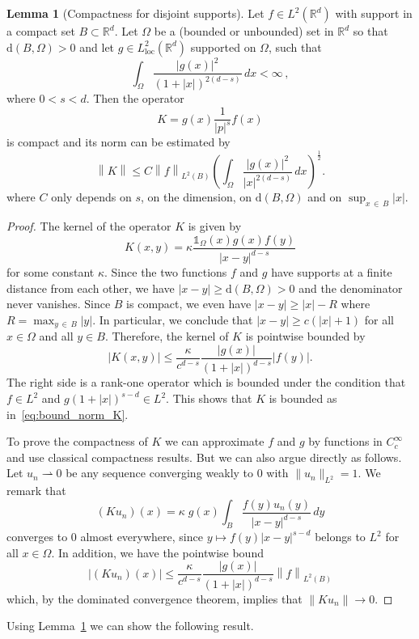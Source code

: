 \documentclass[10pt]{amsart}
\theoremstyle{definition}
\newtheorem{lemma}[cdrthm]{Lemma}
\newcommand{\R}{\mathbb{R}}
\newcommand{\rmd}{\mathrm{d}}
\DeclareMathOperator{\loc}{loc}
\newcommand\1{{\ensuremath {\mathds 1} }}
\newcommand{\wto}{\rightharpoonup}
\newcommand{\ii}{\infty}
\newcommand{\norm}[1]{ \left\| #1 \right\|}
\renewcommand{\geq}{\geqslant}
\renewcommand{\leq}{\leqslant}
\begin{document}
\begin{lemma}[Compactness for disjoint supports]\label{lem:compacness-disjoint-supports}
Let $f\in L^2(\R^d)$ with support in a compact set $B\subset\R^d$. Let $\Omega$ be a (bounded or unbounded) set in $\R^d$ so that $\rmd(B,\Omega)>0$ and let $g\in L^2_{\loc}(\R^d)$ supported on $\Omega$, such that
\[
\int_{\Omega}\frac{|g(x)|^2}{(1+|x|)^{2(d-s)}}\,dx<\ii\,,
\]
where $0<s<d$. Then the operator
\[
K=g(x)\frac{1}{|p|^s}f(x)
\]
is compact and its norm can be estimated by
\begin{equation}\label{eq:bound_norm_K}
\norm{K}\leq C\norm{f}_{L^2(B)}\left(\int_{\Omega}\frac{|g(x)|^2}{|x|^{2(d-s)}}\,dx\right)^{\frac12}.
\end{equation}
where $C$ only depends on $s$, on the dimension, on $\rmd(B,\Omega)$ and on $\sup_{x\,\in\,B}|x|$.
\end{lemma}

\begin{proof}
The kernel of the operator $K$ is given by
\[
K(x,y)=\kappa\frac{\1_\Omega(x)g(x)f(y)}{|x-y|^{d-s}}
\]
for some constant $\kappa$. Since the two functions $f$ and $g$ have supports at a finite distance from each other, we have $|x-y|\geq \rmd(B,\Omega)>0$ and the denominator never vanishes. Since $B$ is compact, we even have $|x-y|\geq |x|-R$ where $R=\max_{y\,\in\,B}|y|$. In particular, we conclude that $|x-y|\geq c(|x|+1)$ for all $x\in \Omega$ and all $y\in B$. Therefore, the kernel of $K$ is pointwise bounded by
\[
\left|K(x,y)\right|\leq \frac{\kappa}{c^{d-s}}\frac{|g(x)|}{(1+|x|)^{d-s}}|f(y)|.
\]
The right side is a rank-one operator which is bounded under the condition that $f\in L^2$ and $g(1+|x|)^{s-d}\in L^2$. This shows that $K$ is bounded as in~\eqref{eq:bound_norm_K}.

To prove the compactness of $K$ we can approximate $f$ and $g$ by functions in $C^\ii_c$ and use classical compactness results. But we can also argue directly as follows. Let $u_n\wto0$ be any sequence converging weakly to 0 with $\|u_n\|_{L^2}=1$. We remark that
\[
(Ku_n)(x)=\kappa\;g(x)\int_{B}\frac{f(y)u_n(y)}{|x-y|^{d-s}}\,dy
\]
converges to 0 almost everywhere, since $y\mapsto f(y)|x-y|^{s-d}$ belongs to $L^2$ for all $x\in\Omega$. In addition, we have the pointwise bound
\[
\left|(Ku_n)(x)\right|\leq \frac{\kappa}{c^{d-s}}\frac{|g(x)|}{(1+|x|)^{d-s}}\norm{f}_{L^2(B)}
\]
which, by the dominated convergence theorem, implies that $\|Ku_n\|\to0$.
\end{proof}

Using Lemma~\ref{lem:compacness-disjoint-supports} we can show the following result.
\end{document}
